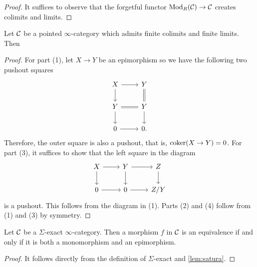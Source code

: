 \documentclass[10pt,a4paper,oneside]{article}
\begin{document}
\begin{proof}
It suffices to observe that the forgetful functor $\operatorname{Mod}_{R}(\mathcal{C})\to\mathcal{C}$ creates colimits and limits.
\end{proof}
\begin{lem}\label{lem:satura}
Let $\mathcal{C}$ be a pointed $\infty$-category which admits finite colimits and finite limits. Then
\end{lem}

\begin{proof}
For part (1), let $X \to Y$ be an epimorphism so we have the following two pushout squares
$$
\begin{tikzcd}
X \arrow[d] \arrow[r] & Y \arrow[d, equals] \\
Y \arrow[r, equals] \arrow[d] & Y \arrow[d] \\
0 \arrow[r]           & 0  .        
\end{tikzcd}
$$
Therefore, the outer square is also a pushout, that is, $\operatorname{coker}(X\to Y) = 0$. For part (3), it suffices to show that the left square in the diagram
$$
\begin{tikzcd}
X \arrow[d] \arrow[r] & Y \arrow[d] \arrow[r] & Z \arrow[d] \\
0 \arrow[r]           & 0 \arrow[r]           & Z/Y        
\end{tikzcd}
$$
is a pushout. This follows from the diagram in (1). Parts (2) and (4) follow from (1) and (3) by symmetry.
\end{proof}

\begin{prop}
Let $\mathcal{C}$ be a $\Sigma$-exact $\infty$-category. Then a morphism $f$ in $\mathcal{C}$ is an equivalence if and only if it is both a monomorphism and an epimorphism.
\end{prop}

\begin{proof}
It follows directly from the definition of $\Sigma$-exact and \cref{lem:satura}.
\end{proof}
\end{document}
